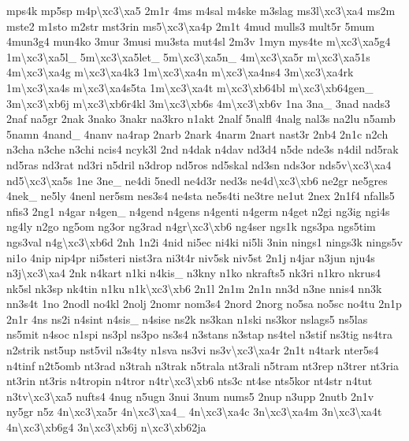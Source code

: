 \begin{DoxyCompactItemize}
mps4k mp5sp m4p\textbackslash{}xc3\textbackslash{}xa5 2m1r 4ms m4sal m4ske m3slag ms3l\textbackslash{}xc3\textbackslash{}xa4 ms2m mste2 m1sto m2str mst3rin ms5\textbackslash{}xc3\textbackslash{}xa4p 2m1t 4mud mulls3 mult5r 5mum 4mun3g4 mun4ko 3mur 3musi mu3sta mut4sl 2m3v 1myn mys4te m\textbackslash{}xc3\textbackslash{}xa5g4 1m\textbackslash{}xc3\textbackslash{}xa5l\-\_\- 5m\textbackslash{}xc3\textbackslash{}xa5let\-\_\- 5m\textbackslash{}xc3\textbackslash{}xa5n\-\_\- 4m\textbackslash{}xc3\textbackslash{}xa5r m\textbackslash{}xc3\textbackslash{}xa51s 4m\textbackslash{}xc3\textbackslash{}xa4g m\textbackslash{}xc3\textbackslash{}xa4k3 1m\textbackslash{}xc3\textbackslash{}xa4n m\textbackslash{}xc3\textbackslash{}xa4ns4 3m\textbackslash{}xc3\textbackslash{}xa4rk 1m\textbackslash{}xc3\textbackslash{}xa4s m\textbackslash{}xc3\textbackslash{}xa4s5ta 1m\textbackslash{}xc3\textbackslash{}xa4t m\textbackslash{}xc3\textbackslash{}xb64bl m\textbackslash{}xc3\textbackslash{}xb64gen\-\_\- 3m\textbackslash{}xc3\textbackslash{}xb6j m\textbackslash{}xc3\textbackslash{}xb6r4kl 3m\textbackslash{}xc3\textbackslash{}xb6s 4m\textbackslash{}xc3\textbackslash{}xb6v 1na 3na\-\_\- 3nad nads3 2naf na5gr 2nak 3nako 3nakr na3kro n1akt 2nalf 5nalfl 4nalg nal3s na2lu n5amb 5namn 4nand\-\_\- 4nanv na4rap 2narb 2nark 4narm 2nart nast3r 2nb4 2n1c n2ch n3cha n3che n3chi ncis4 ncyk3l 2nd n4dak n4dav nd3d4 n5de nde3s n4dil nd5rak nd5ras nd3rat nd3ri n5dril n3drop nd5ros nd5skal nd3sn nds3or nds5v\textbackslash{}xc3\textbackslash{}xa4 nd5\textbackslash{}xc3\textbackslash{}xa5s 1ne 3ne\-\_\- ne4di 5nedl ne4d3r ned3s ne4d\textbackslash{}xc3\textbackslash{}xb6 ne2gr ne5gres 4nek\-\_\- ne5ly 4nenl ner5sm nes3s4 ne4sta ne5s4ti ne3tre ne1ut 2nex 2n1f4 nfalls5 nfis3 2ng1 n4gar n4gen\-\_\- n4gend n4gens n4genti n4germ n4get n2gi ng3ig ngi4s ng4ly n2go ng5om ng3or ng3rad n4gr\textbackslash{}xc3\textbackslash{}xb6 ng4ser ngs1k ngs3pa ngs5tim ngs3val n4g\textbackslash{}xc3\textbackslash{}xb6d 2nh 1n2i 4nid ni5ec ni4ki ni5li 3nin nings1 nings3k nings5v ni1o 4nip nip4pr ni5steri nist3ra ni3t4r niv5sk niv5st 2n1j n4jar n3jun nju4s n3j\textbackslash{}xc3\textbackslash{}xa4 2nk n4kart n1ki n4kis\-\_\- n3kny n1ko nkrafts5 nk3ri n1kro nkrus4 nk5sl nk3sp nk4tin n1ku n1k\textbackslash{}xc3\textbackslash{}xb6 2n1l 2n1m 2n1n nn3d n3ne nnis4 nn3k nn3s4t 1no 2nodl no4kl 2nolj 2nomr nom3s4 2nord 2norg no5sa no5sc no4tu 2n1p 2n1r 4ns ns2i n4sint n4sis\-\_\- n4sise ns2k ns3kan n1ski ns3kor nslags5 ns5las ns5mit n4soc n1spi ns3pl ns3po ns3s4 n3stans n3stap ns4tel n3stif ns3tig ns4tra n2strik nst5up nst5vil n3s4ty n1sva ns3vi ns3v\textbackslash{}xc3\textbackslash{}xa4r 2n1t n4tark nter5s4 n4tinf n2t5omb nt3rad n3trah n3trak n5trala nt3rali n5tram nt3rep n3trer nt3ria nt3rin nt3ris n4tropin n4tror n4tr\textbackslash{}xc3\textbackslash{}xb6 nts3c nt4se nts5kor nt4str n4tut n3tv\textbackslash{}xc3\textbackslash{}xa5 nufts4 4nug n5ugn 3nui 3num nums5 2nup n3upp 2nutb 2n1v ny5gr n5z 4n\textbackslash{}xc3\textbackslash{}xa5r 4n\textbackslash{}xc3\textbackslash{}xa4\-\_\- 4n\textbackslash{}xc3\textbackslash{}xa4c 3n\textbackslash{}xc3\textbackslash{}xa4m 3n\textbackslash{}xc3\textbackslash{}xa4t 4n\textbackslash{}xc3\textbackslash{}xb6g4 3n\textbackslash{}xc3\textbackslash{}xb6j n\textbackslash{}xc3\textbackslash{}xb62ja 
\end{DoxyCompactItemize}
